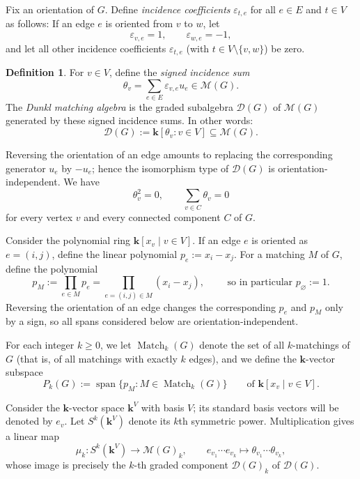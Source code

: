 \documentclass[12pt]{amsart}
\theoremstyle{definition}
\newtheorem{definition}[theorem]{Definition}
\theoremstyle{remark}
\newcommand{\kk}{\mathbf{k}}
\newcommand{\Span}{\operatorname{span}}
\newcommand{\Match}{\operatorname{Match}}
\begin{document}
Fix an orientation of $G$.  Define \emph{incidence coefficients}
$\varepsilon_{t,e}$ for all $e \in E$ and $t \in V$ as follows:
If an edge $e$ is oriented from $v$ to $w$, let
\[
\varepsilon_{v,e}=1, \qquad
\varepsilon_{w,e}=-1,
\]
and let all other incidence
coefficients $\varepsilon_{t,e}$ (with $t \in V \setminus \{v,w\}$) be zero.

\begin{definition}
For $v\in V$, define the \emph{signed incidence sum}
\[
 \theta_v=\sum_{e\in E}\varepsilon_{v,e}u_e \in \mathcal M(G).
\]
The \emph{Dunkl matching algebra} is the graded subalgebra
$\mathcal D(G)$ of $\mathcal M(G)$ generated by these
signed incidence sums. In other words:
\[
 \mathcal D(G):=\kk[\theta_v:v\in V]\subseteq\mathcal M(G).
\]
\end{definition}

Reversing the orientation of an edge amounts to replacing the corresponding
generator $u_e$ by $-u_e$; hence the isomorphism type of $\mathcal D(G)$ is
orientation-independent.  We have
\begin{equation}\label{eq:elementary-relations}
 \theta_v^2=0,
 \qquad
 \sum_{v\in C}\theta_v=0
\end{equation}
for every vertex $v$ and every connected component $C$ of $G$.

Consider the polynomial ring $\kk[x_v \mid v \in V]$.  If an edge $e$ is
oriented as $e=(i,j)$, define the linear polynomial $p_e:=x_i-x_j$.
For a matching $M$ of $G$, define the polynomial
\begin{equation}\label{eq:def-pM}
 p_M:=\prod_{e\in M}p_e
 =\prod_{e=(i,j)\in M}(x_i-x_j),
 \qquad \text{ so in particular } p_\varnothing:=1.
\end{equation}
Reversing the orientation of an edge changes the corresponding $p_e$ and
$p_M$ only by a sign, so all spans considered below are
orientation-independent.

For each integer $k \geq 0$, we let $\Match_k(G)$ denote the set of
all $k$-matchings of $G$ (that is, of all matchings with
exactly $k$ edges), and we define the $\kk$-vector subspace
\begin{equation}\label{eq:def-Pk}
 P_k(G):=\Span\{p_M:M\in\Match_k(G)\}
 \qquad \text{of $\kk[x_v \mid v \in V]$.}
\end{equation}

Consider the $\kk$-vector space $\kk^V$ with basis $V$; its standard
basis vectors will be denoted by $e_v$.
Let $S^k(\kk^V)$ denote its $k$th symmetric power.  Multiplication gives a
linear map
\[
 \mu_k:S^k(\kk^V)\longrightarrow \mathcal M(G)_k,
 \qquad
 e_{v_1}\cdots e_{v_k}\longmapsto
 \theta_{v_1}\cdots\theta_{v_k},
\]
whose image is precisely the $k$-th graded component $\mathcal D(G)_k$
of $\mathcal D(G)$.
\end{document}
